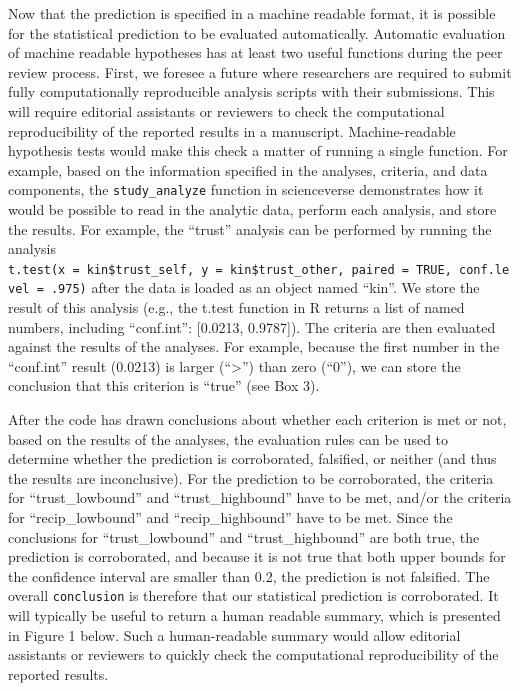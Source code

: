 \documentclass[english,doc,floatsintext]{apa6}
\begin{document}
Now that the prediction is specified in a machine readable format, it is possible for the statistical prediction to be evaluated automatically. Automatic evaluation of machine readable hypotheses has at least two useful functions during the peer review process. First, we foresee a future where researchers are required to submit fully computationally reproducible analysis scripts with their submissions. This will require editorial assistants or reviewers to check the computational reproducibility of the reported results in a manuscript. Machine-readable hypothesis tests would make this check a matter of running a single function. For example, based on the information specified in the analyses, criteria, and data components, the \texttt{study\_analyze} function in scienceverse demonstrates how it would be possible to read in the analytic data, perform each analysis, and store the results. For example, the \enquote{trust} analysis can be performed by running the analysis \texttt{t.test(x\ =\ kin\$trust\_self,\ y\ =\ kin\$trust\_other,\ paired\ =\ TRUE,\ conf.level\ =\ .975)} after the data is loaded as an object named \enquote{kin}. We store the result of this analysis (e.g., the t.test function in R returns a list of named numbers, including \enquote{conf.int}: {[}0.0213, 0.9787{]}). The criteria are then evaluated against the results of the analyses. For example, because the first number in the \enquote{conf.int} result (0.0213) is larger (\enquote{\textgreater{}}) than zero (\enquote{0}), we can store the conclusion that this criterion is \enquote{true} (see Box 3).

After the code has drawn conclusions about whether each criterion is met or not, based on the results of the analyses, the evaluation rules can be used to determine whether the prediction is corroborated, falsified, or neither (and thus the results are inconclusive). For the prediction to be corroborated, the criteria for \enquote{trust\_lowbound} and \enquote{trust\_highbound} have to be met, and/or the criteria for \enquote{recip\_lowbound} and \enquote{recip\_highbound} have to be met. Since the conclusions for \enquote{trust\_lowbound} and \enquote{trust\_highbound} are both true, the prediction is corroborated, and because it is not true that both upper bounds for the confidence interval are smaller than 0.2, the prediction is not falsified. The overall \texttt{conclusion} is therefore that our statistical prediction is corroborated. It will typically be useful to return a human readable summary, which is presented in Figure 1 below. Such a human-readable summary would allow editorial assistants or reviewers to quickly check the computational reproducibility of the reported results.
\end{document}
